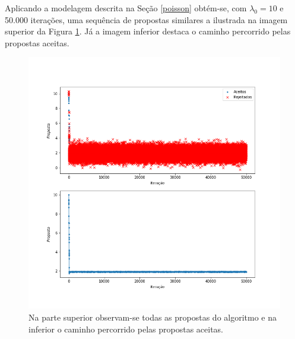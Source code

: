 \documentclass[11pt,letterpaper,twocolumn]{article}
\begin{document}
Aplicando a modelagem descrita na Seção \ref{poisson} obtém-se, com $\lambda_0 = 10$ e 50.000 iterações, uma sequência de propostas similares a ilustrada na imagem superior da Figura \ref{fig05p}. Já a imagem inferior destaca o caminho percorrido pelas propostas aceitas.
\begin{figure}[hbt]
    \centering
    \includegraphics[scale = 0.40, center]{Poisson/fig05 - poisson.png}
    \caption{Na parte superior observam-se todas as propostas do algoritmo e na inferior o caminho percorrido pelas propostas aceitas.}
    \label{fig05p}
\end{figure}
\end{document}
